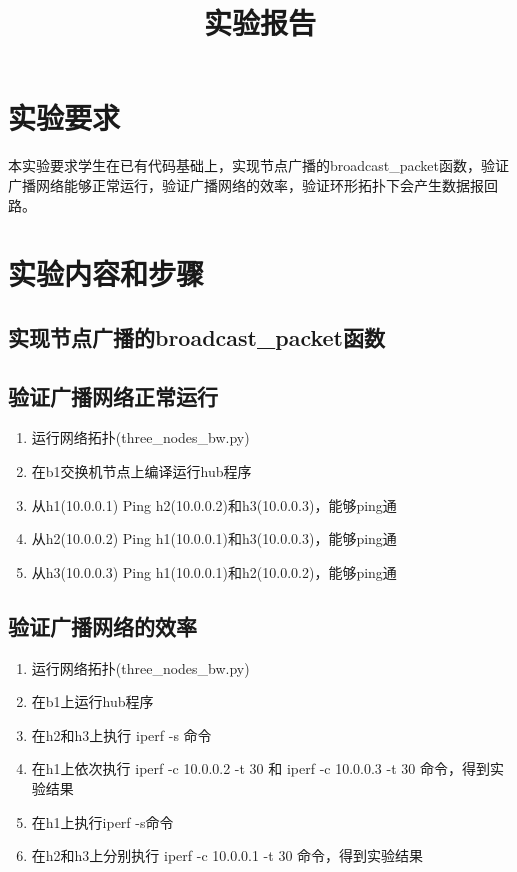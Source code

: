 \documentclass{zjureport}
\title{实验报告}
\date{\zhtoday}
\begin{document}
\makecover
\makeheader


\section{实验要求}
  本实验要求学生在已有代码基础上，实现节点广播的broadcast\_packet函数，验证广播网络能够正常运行，验证广播网络的效率，验证环形拓扑下会产生数据报回路。

\section{实验内容和步骤}
  \subsection{实现节点广播的broadcast\_packet函数}
  \subsection{验证广播网络正常运行}

      \begin{enumerate}
          \item 运行网络拓扑(three\_nodes\_bw.py)
          \item 在b1交换机节点上编译运行hub程序
          \item 从h1(10.0.0.1) Ping h2(10.0.0.2)和h3(10.0.0.3)，能够ping通
          \item 从h2(10.0.0.2) Ping h1(10.0.0.1)和h3(10.0.0.3)，能够ping通
          \item 从h3(10.0.0.3) Ping h1(10.0.0.1)和h2(10.0.0.2)，能够ping通
      \end{enumerate}

  \subsection{验证广播网络的效率}

      \begin{enumerate}
          \item 运行网络拓扑(three\_nodes\_bw.py)
          \item 在b1上运行hub程序
          \item 在h2和h3上执行 iperf -s 命令
          \item 在h1上依次执行 iperf -c 10.0.0.2 -t 30 和 iperf -c 10.0.0.3 -t 30 命令，得到实验结果
          \item 在h1上执行iperf -s命令
          \item 在h2和h3上分别执行 iperf -c 10.0.0.1 -t 30 命令，得到实验结果
      \end{enumerate}
\end{document}
